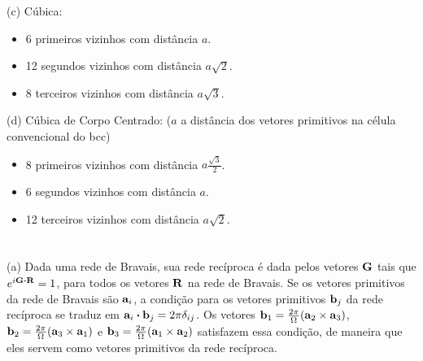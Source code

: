 \documentclass[a4paper,10pt]{article}
\begin{document}
\n

(c) Cúbica:

\begin{itemize}
\item 6 primeiros vizinhos com distância $a$.
\item 12 segundos vizinhos com distância $a\sqrt{2}$.
\item 8 terceiros vizinhos com distância $a\sqrt{3}$.
\end{itemize}

(d) Cúbica de Corpo Centrado: ($a$ a distância dos vetores primitivos na célula convencional do bcc)

\begin{itemize}
\item 8 primeiros vizinhos com distância $a \frac{\sqrt{3}}{2}$.
\item 6 segundos vizinhos com distância $a$.
\item 12 terceiros vizinhos com distância $a\sqrt{2}$.
\end{itemize}

\section{}

(a) Dada uma rede de Bravais, sua rede recíproca é dada pelos vetores $\vb{G}$ tais que $e^{i \vb{G} \vdot \vb{R}} = 1$, para todos os vetores $\vb{R}$ na rede de Bravais. Se os vetores primitivos da rede de Bravais são $\vb{a}_i$, a condição para os vetores primitivos $\vb{b}_j$ da rede recíproca se traduz em $\a_i \vdot \b_j = 2\pi \delta_{ij}$. Os vetores $\vb{b}_1 = \frac{2\pi}{\Omega} (\vb{a}_2 \times \vb{a}_3)$, $\vb{b}_2 = \frac{2\pi}{\Omega} (\vb{a}_3 \times \vb{a}_1)$ e $\vb{b}_3 = \frac{2\pi}{\Omega} (\vb{a}_1 \times \vb{a}_2)$ satisfazem essa condição, de maneira que eles servem como vetores primitivos da rede recíproca.
\end{document}

